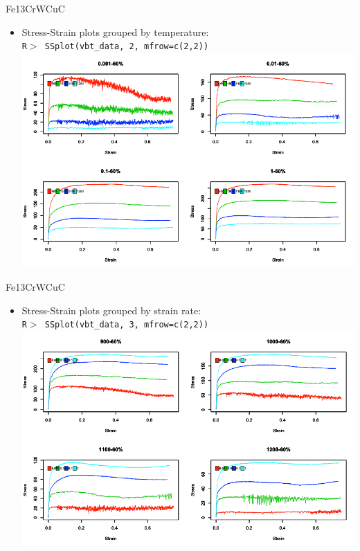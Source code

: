 \documentclass[11pt]{beamer}
\newcommand{\code}[1]{\texttt{#1}}
\begin{document}
\begin{frame}[t]{Fe{\color{red}13Cr}WCuC}
	\begin{minipage}[t]{1\textwidth}
        \vspace{0pt}
        \begin{itemize}
            \item {\small Stress-Strain plots grouped by temperature:\\ {\scriptsize\code{R$>$ SSplot(vbt\_data, {\color{red}2}, mfrow=c(2,2))}}}\\
            \includegraphics[scale=0.29]{Fig5.png}
        \end{itemize}
    \end{minipage}%
\end{frame}

\begin{frame}[t]{Fe{\color{red}13Cr}WCuC}
	\begin{minipage}[t]{1\textwidth}
        \vspace{0pt}
        \begin{itemize}
            \item {\small Stress-Strain plots grouped by strain rate:\\ {\scriptsize\code{R$>$ SSplot(vbt\_data, {\color{red}3}, mfrow=c(2,2))}}}\\
            \includegraphics[scale=0.29]{Fig6.png}
        \end{itemize}
    \end{minipage}%
\end{frame}
\end{document}
